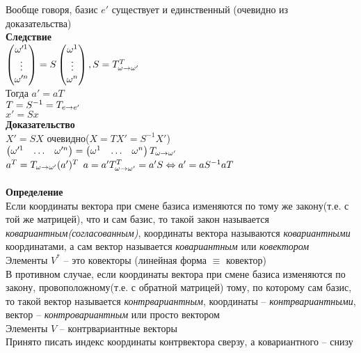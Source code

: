 \documentclass[12pt]{article}
\begin{document}
Вообще говоря, базис $e'$ существует и единственный (очевидно из доказательства)\\
\textbf{Следствие}\\
$\begin{pmatrix}
    \omega'^1\\\vdots\\\omega'^n
\end{pmatrix} = S\begin{pmatrix}
    \omega^1\\\vdots\\\omega^n
\end{pmatrix}, S = T_{\omega \rightarrow \omega'}^T$\\
Тогда $a'=aT$\\
$T = S^{-1} = T_{e\rightarrow e'}$\\
$x'=Sx$\\
\textbf{Доказательство}\\
$X' = SX$ очевидно($X=TX'=S^{-1}X'$)\\
$\begin{pmatrix}
    \omega'^1 & \ldots & \omega'^n
\end{pmatrix} = \begin{pmatrix}
    \omega^1 & \ldots & \omega^n
\end{pmatrix} T_{\omega \rightarrow \omega'}$\\
$a^T = T_{\omega\rightarrow \omega'}(a')^T$
$a=a'T^T_{\omega\rightarrow\omega'} = a'S \Leftrightarrow a'=aS^{-1}aT$\\\\
\textbf{Определение}\\
Если координаты вектора при смене базиса изменяются по тому же закону(т.е. с той же матрицей), что и сам базис, то такой закон называется \textit{ковариантным(согласованным)}, координаты вектора называются \textit{ковариантными} координатами, а сам вектор называется \textit{ковариантным} или \textit{ковектором}\\
Элементы $V^*$ -- это ковекторы (линейная форма $\equiv$ ковектор)\\
В противном случае, если координаты вектора при смене базиса изменяются по закону, провоположному(т.е. с обратной матрицей) тому, по которому сам базис, то такой вектор называется \textit{контрвариантным}, координаты -- \textit{контрвариантными}, вектор -- \textit{контровариантным} или просто вектором\\
Элементы $V$ -- контрвариантные векторы\\
Принято писать индекс координаты контрвектора сверзу, а ковариантного -- снизу\\\\
\end{document}

